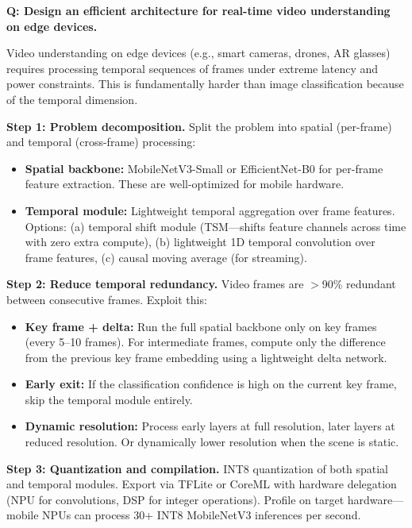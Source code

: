 \begin{interviewq}
\textbf{Q: Design an efficient architecture for real-time video understanding on edge devices.}

 \quad {} \quad \badgefreq{\freqlow}

\stronganswer

Video understanding on edge devices (e.g., smart cameras, drones, AR glasses) requires processing temporal sequences of frames under extreme latency and power constraints. This is fundamentally harder than image classification because of the temporal dimension.

\textbf{Step 1: Problem decomposition.}
Split the problem into spatial (per-frame) and temporal (cross-frame) processing:
\begin{itemize}
    \item \textbf{Spatial backbone:} MobileNetV3-Small or EfficientNet-B0 for per-frame feature extraction. These are well-optimized for mobile hardware.
    \item \textbf{Temporal module:} Lightweight temporal aggregation over frame features. Options: (a) temporal shift module (TSM---shifts feature channels across time with zero extra compute), (b) lightweight 1D temporal convolution over frame features, (c) causal moving average (for streaming).
\end{itemize}

\textbf{Step 2: Reduce temporal redundancy.}
Video frames are $>$90\% redundant between consecutive frames. Exploit this:
\begin{itemize}
    \item \textbf{Key frame + delta:} Run the full spatial backbone only on key frames (every 5--10 frames). For intermediate frames, compute only the difference from the previous key frame embedding using a lightweight delta network.
    \item \textbf{Early exit:} If the classification confidence is high on the current key frame, skip the temporal module entirely.
    \item \textbf{Dynamic resolution:} Process early layers at full resolution, later layers at reduced resolution. Or dynamically lower resolution when the scene is static.
\end{itemize}

\textbf{Step 3: Quantization and compilation.}
INT8 quantization of both spatial and temporal modules. Export via TFLite or CoreML with hardware delegation (NPU for convolutions, DSP for integer operations). Profile on target hardware---mobile NPUs can process 30+ INT8 MobileNetV3 inferences per second.


\end{interviewq}
